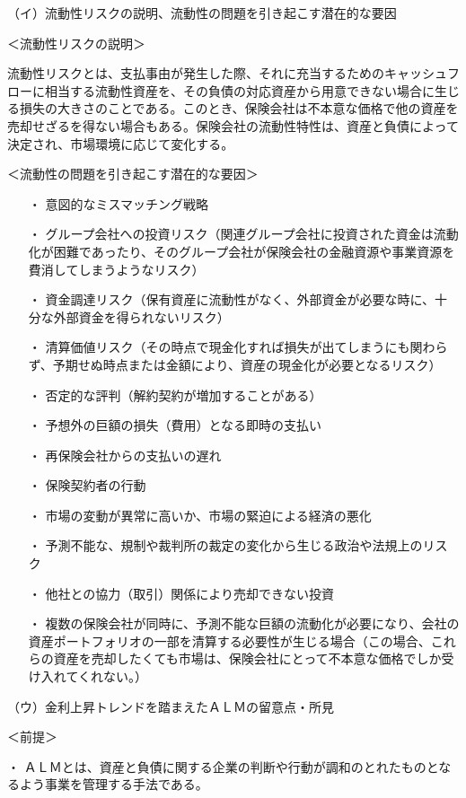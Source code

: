 \documentclass[report,gutter=10mm,fore-edge=10mm,uplatex,dvipdfmx]{jlreq}
\begin{document}
（イ）流動性リスクの説明、流動性の問題を引き起こす潜在的な要因 

＜流動性リスクの説明＞

流動性リスクとは、支払事由が発生した際、それに充当するためのキャッシュフローに相当する流動性資産を、その負債の対応資産から用意できない場合に生じる損失の大きさのことである。このとき、保険会社は不本意な価格で他の資産を売却せざるを得ない場合もある。保険会社の流動性特性は、資産と負債によって決定され、市場環境に応じて変化する。

＜流動性の問題を引き起こす潜在的な要因＞
\begin{itemize}
 \item [ ・]  意図的なミスマッチング戦略
 \item [ ・]  グループ会社への投資リスク（関連グループ会社に投資された資金は流動化が困難であったり、そのグループ会社が保険会社の金融資源や事業資源を費消してしまうようなリスク）
 \item [ ・]  資金調達リスク（保有資産に流動性がなく、外部資金が必要な時に、十分な外部資金を得られないリスク）
 \item [ ・]  清算価値リスク（その時点で現金化すれば損失が出てしまうにも関わらず、予期せぬ時点または金額により、資産の現金化が必要となるリスク）
 \item [ ・]  否定的な評判（解約契約が増加することがある）
 \item [ ・]  予想外の巨額の損失（費用）となる即時の支払い
 \item [ ・]  再保険会社からの支払いの遅れ
 \item [ ・]  保険契約者の行動
 \item [ ・]  市場の変動が異常に高いか、市場の緊迫による経済の悪化
 \item [ ・]  予測不能な、規制や裁判所の裁定の変化から生じる政治や法規上のリスク
 \item [ ・]  他社との協力（取引）関係により売却できない投資
 \item [ ・]  複数の保険会社が同時に、予測不能な巨額の流動化が必要になり、会社の資産ポートフォリオの一部を清算する必要性が生じる場合（この場合、これらの資産を売却したくても市場は、保険会社にとって不本意な価格でしか受け入れてくれない。）
\end{itemize}


（ウ）金利上昇トレンドを踏まえたＡＬＭの留意点・所見 

＜前提＞

・ ＡＬＭとは、資産と負債に関する企業の判断や行動が調和のとれたものとなるよう事業を管理する手法である。
\end{document}
